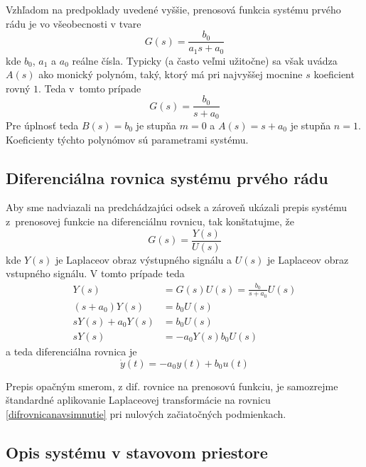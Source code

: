 \documentclass[a4paper, 10pt, ]{article}
\begin{document}
Vzhľadom na predpoklady uvedené vyššie, prenosová funkcia systému prvého rádu je vo všeobecnosti v tvare
\begin{equation}
    G(s) = \frac{b_0}{a_1 s + a_0}
\end{equation}
kde $b_0$, $a_1$ a $a_0$ reálne čísla. Typicky (a často veľmi užitočne) sa však uvádza $A(s)$ ako monický polynóm, taký, ktorý má pri najvyššej mocnine $s$ koeficient rovný $1$. Teda v~tomto prípade
\begin{equation}
    G(s) = \frac{b_0}{s + a_0}
\end{equation}
Pre úplnosť teda $B(s) = b_0$ je stupňa $m=0$ a $A(s) = s + a_0$ je stupňa $n=1$. Koeficienty týchto polynómov sú parametrami systému.



\subsection{Diferenciálna rovnica systému prvého rádu}

Aby sme nadviazali na predchádzajúci odsek a zároveň ukázali prepis systému z~prenosovej funkcie na diferenciálnu rovnicu, tak konštatujme, že
\begin{equation}
    G(s) = \frac{Y(s)}{U(s)}
\end{equation}
kde $Y(s)$ je Laplaceov obraz výstupného signálu a $U(s)$ je Laplaceov obraz vstupného signálu. V tomto prípade teda
\begin{subequations}
\begin{align}
    Y(s) &= G(s) U(s) = \frac{b_0}{s + a_0} U(s) \\
    \left(s + a_0\right) Y(s) &= b_0 U(s) \\
    s Y(s) + a_0 Y(s) &= b_0 U(s) \\
    s Y(s)  &= -  a_0 Y(s) b_0 U(s) 
\end{align}
\end{subequations}
a teda diferenciálna rovnica je
\begin{equation} \label{difrovnicanavsimnutie}
    \dot y(t) = - a_0 y(t) + b_0 u(t)
\end{equation}

Prepis opačným smerom, z dif. rovnice na prenosovú funkciu, je samozrejme štandardné aplikovanie Laplaceovej transformácie na rovnicu \eqref{difrovnicanavsimnutie} pri nulových začiatočných podmienkach. 





\subsection{Opis systému v stavovom priestore}
\end{document}
